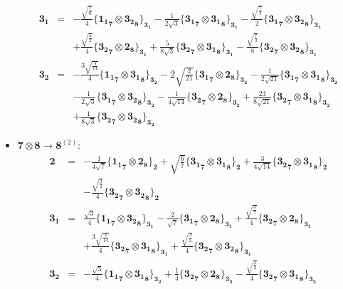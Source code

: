 \documentclass[english]{article}
\newcommand{\subcg}[3]{\big\{ {#1}\otimes{#2}\big\}^{}_{#3}}
\newcommand{\rep}[1]{\mathbf{#1}}
\begin{document}
\begin{itemize}
\begin{eqnarray*}
\\
\rep{3_1} &=& -\frac{\sqrt{\frac{7}{6}}}{4}\subcg{\rep{1_1}_{\rep{7}}}{\rep{3_2}_{\rep{8}}}{\rep{3_1}}-\frac{1}{2 \sqrt{3}}\subcg{\rep{3_1}_{\rep{7}}}{\rep{3_1}_{\rep{8}}}{\rep{3_1}}-\frac{\sqrt{\frac{7}{3}}}{2}\subcg{\rep{3_1}_{\rep{7}}}{\rep{3_2}_{\rep{8}}}{\rep{3_1}} \\ 
 & & +\frac{\sqrt{\frac{3}{2}}}{4}\subcg{\rep{3_2}_{\rep{7}}}{\rep{2}_{\rep{8}}}{\rep{3_1}}+\frac{5}{8 \sqrt{3}}\subcg{\rep{3_2}_{\rep{7}}}{\rep{3_1}_{\rep{8}}}{\rep{3_1}}-\frac{\sqrt{\frac{7}{3}}}{8}\subcg{\rep{3_2}_{\rep{7}}}{\rep{3_2}_{\rep{8}}}{\rep{3_1}}
\\
\rep{3_2} &=& -\frac{3 \sqrt{\frac{3}{14}}}{4}\subcg{\rep{1_1}_{\rep{7}}}{\rep{3_1}_{\rep{8}}}{\rep{3_2}}-2 \sqrt{\frac{2}{21}}\subcg{\rep{3_1}_{\rep{7}}}{\rep{2}_{\rep{8}}}{\rep{3_2}}-\frac{1}{2 \sqrt{21}}\subcg{\rep{3_1}_{\rep{7}}}{\rep{3_1}_{\rep{8}}}{\rep{3_2}} \\ 
 & & -\frac{1}{2 \sqrt{3}}\subcg{\rep{3_1}_{\rep{7}}}{\rep{3_2}_{\rep{8}}}{\rep{3_2}}-\frac{1}{4 \sqrt{14}}\subcg{\rep{3_2}_{\rep{7}}}{\rep{2}_{\rep{8}}}{\rep{3_2}}+\frac{23}{8 \sqrt{21}}\subcg{\rep{3_2}_{\rep{7}}}{\rep{3_1}_{\rep{8}}}{\rep{3_2}} \\ 
 & & +\frac{1}{8 \sqrt{3}}\subcg{\rep{3_2}_{\rep{7}}}{\rep{3_2}_{\rep{8}}}{\rep{3_2}}
\end{eqnarray*}
\item $\rep{7}\otimes\rep{8}\to\rep{8}^{(2)}$:
\begin{eqnarray*}
\rep{2} &=& -\frac{1}{4 \sqrt{7}}\subcg{\rep{1_1}_{\rep{7}}}{\rep{2}_{\rep{8}}}{\rep{2}}+\sqrt{\frac{6}{7}}\subcg{\rep{3_1}_{\rep{7}}}{\rep{3_1}_{\rep{8}}}{\rep{2}}+\frac{3}{4 \sqrt{14}}\subcg{\rep{3_2}_{\rep{7}}}{\rep{3_1}_{\rep{8}}}{\rep{2}} \\ 
 & & -\frac{\sqrt{\frac{3}{2}}}{4}\subcg{\rep{3_2}_{\rep{7}}}{\rep{3_2}_{\rep{8}}}{\rep{2}}
\\
\rep{3_1} &=& \frac{\sqrt{3}}{4}\subcg{\rep{1_1}_{\rep{7}}}{\rep{3_2}_{\rep{8}}}{\rep{3_1}}-\frac{2}{\sqrt{7}}\subcg{\rep{3_1}_{\rep{7}}}{\rep{2}_{\rep{8}}}{\rep{3_1}}+\frac{\sqrt{\frac{3}{7}}}{4}\subcg{\rep{3_2}_{\rep{7}}}{\rep{2}_{\rep{8}}}{\rep{3_1}} \\ 
 & & +\frac{3 \sqrt{\frac{3}{14}}}{4}\subcg{\rep{3_2}_{\rep{7}}}{\rep{3_1}_{\rep{8}}}{\rep{3_1}}+\frac{\sqrt{\frac{3}{2}}}{4}\subcg{\rep{3_2}_{\rep{7}}}{\rep{3_2}_{\rep{8}}}{\rep{3_1}}
\\
\rep{3_2} &=& -\frac{\sqrt{3}}{4}\subcg{\rep{1_1}_{\rep{7}}}{\rep{3_1}_{\rep{8}}}{\rep{3_2}}+\frac{1}{4}\subcg{\rep{3_2}_{\rep{7}}}{\rep{2}_{\rep{8}}}{\rep{3_2}}-\frac{\sqrt{\frac{3}{2}}}{4}\subcg{\rep{3_2}_{\rep{7}}}{\rep{3_1}_{\rep{8}}}{\rep{3_2}} \\ 

\end{eqnarray*}
\end{itemize}
\end{document}
